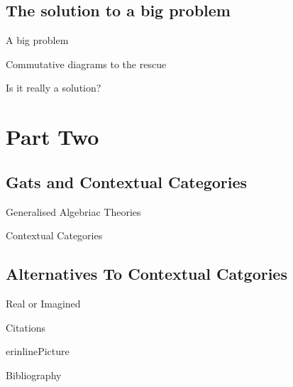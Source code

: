 \documentclass{beamer}
\renewcommand{\erpictureFolder}[0]{../SharedPictures}
\begin{document}
\subsection{The solution to a big problem}
\begin{frame}{A big problem}
\end{frame}
\begin{frame}{Commutative diagrams to the rescue}
\end{frame}
\begin{frame}{Is it really a solution?}
\end{frame}

\section{Part Two}
\subsection{Gats and Contextual Categories}
\begin{frame}{Generalised Algebriac Theories}
\end{frame}
\begin{frame}{Contextual Categories}
\end{frame}
\subsection{Alternatives To Contextual Catgories}
\begin{frame}{Real or Imagined}
\end{frame}

\begin{frame}{Citations}
\cite{Cartmell78}
\nocite{erhard88}
\end{frame}

\begin{frame}{erinlinePicture}

\end{frame}

\begin{frame}{Bibliography}

\end{frame}
\end{document}
